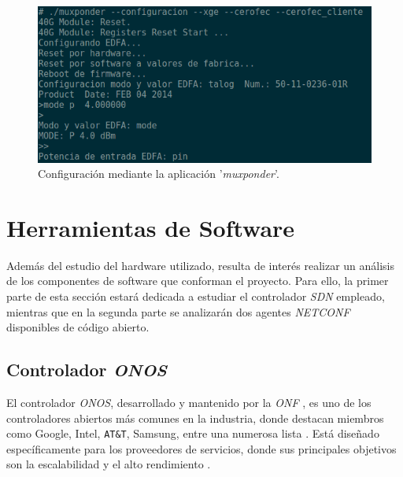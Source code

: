 \begin{itemize}
	\begin{figure}[H]
	  \centering
	  \includegraphics[scale=0.63]{Figures/muxponderapp.png}
	  \caption{Configuración mediante la aplicación ’\textit{muxponder}’.}
	  \label{fig:mxpapp}
	\end{figure}
\end{itemize}



  




\section{Herramientas de Software}

Además del estudio del hardware utilizado, resulta de interés realizar un análisis de los componentes de software que conforman el proyecto. Para ello, la primer parte de esta sección estará dedicada a estudiar el controlador \textit{SDN} empleado, mientras que en la segunda parte se analizarán dos agentes \textit{NETCONF} disponibles de código abierto.

\subsection{Controlador \textit{ONOS}}
El controlador \textit{ONOS}, desarrollado y mantenido por la \textit{ONF} \parencite{onff}, es uno de los controladores abiertos más comunes en la industria, donde destacan miembros como Google, Intel, \texttt{AT\&T}, Samsung, entre una numerosa lista \parencite{onffmembers}. Está diseñado específicamente para los proveedores de servicios, donde sus principales objetivos son la escalabilidad y el alto rendimiento \parencite{onffwhite}.

